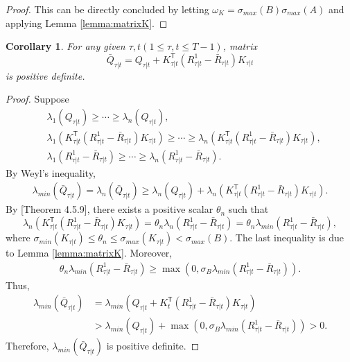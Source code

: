 \documentclass[letterpaper, 10 pt, conference]{ieeeconf}  %
\newcommand{\transpose}{\mathsf{T}}
\newtheorem{corollary}{Corollary}
\begin{document}
\begin{proof}
    This can be directly concluded by letting $\omega_{K} = \sigma_{max}(B)\sigma_{max}(A)$ and applying Lemma \ref{lemma:matrixK}.
\end{proof}

\begin{corollary}
    For any given $\tau,t(1\leq \tau, t \leq T-1)$, matrix
    \begin{equation}
        \bar{Q}_{\tau|t} = Q_{\tau|t} + K_{\tau|t}^{\transpose}(R_{\tau|t}^{1} - \bar{R}_{\tau|t})K_{\tau|t}
    \end{equation}
    is positive definite.
\end{corollary}
\begin{proof}
    Suppose
    \begin{align*}
        &\lambda_{1}(Q_{\tau|t}) \geq \cdots \geq \lambda_{n}(Q_{\tau|t}),\\
        &\lambda_{1}(K_{\tau|t}^{\transpose}(R_{\tau|t}^{1} - \bar{R}_{\tau|t})K_{\tau|t}) \geq \cdots \geq \lambda_{n}(K_{\tau|t}^{\transpose}(R_{\tau|t}^{1} - \bar{R}_{\tau|t})K_{\tau|t}),\\
        &\lambda_{1}(R_{\tau|t}^{1} - \bar{R}_{\tau|t}) \geq \cdots \geq \lambda_{n}(R_{\tau|t}^{1} - \bar{R}_{\tau|t}).
    \end{align*}
    By Weyl's inequality,
    \begin{align*}
        \lambda_{min}(\bar{Q}_{\tau|t}) = \lambda_{n}(\bar{Q}_{\tau|t})\geq \lambda_{n}(Q_{\tau|t}) + \lambda_{n}(K_{\tau|t}^{\transpose}(R_{\tau|t}^{1} - \bar{R}_{\tau|t})K_{\tau|t}).
    \end{align*}
    By \cite{horn_matrix_2013}[Theorem 4.5.9], there exists a positive scalar $\theta_{n}$ such that
    \begin{equation}
        \lambda_{n}(K_{\tau|t}^{\transpose}(R_{\tau|t}^{1} - \bar{R}_{\tau|t})K_{\tau|t}) = \theta_{n}\lambda_{n}(R_{\tau|t}^{1} - \bar{R}_{\tau|t}) = \theta_{n}\lambda_{min}(R_{\tau|t}^{1} - \bar{R}_{\tau|t}),
    \end{equation}
    where $\sigma_{min}(K_{\tau|t}) \leq \theta_{n} \leq \sigma_{max}(K_{\tau|t}) < \sigma_{max}(B)$.
    The last inequality is due to Lemma \ref{lemma:matrixK}. Moreover,
    \begin{align*}
        \theta_{n}\lambda_{min}(R_{\tau|t}^{1} - \bar{R}_{\tau|t}) \geq \max(0,\sigma_{B}\lambda_{min}(R_{\tau|t}^{1} - \bar{R}_{\tau|t})).
    \end{align*}
    Thus, 
    \begin{align*}
        \lambda_{min}(\bar{Q}_{\tau|t}) &= \lambda_{min}(Q_{\tau|t}+K_{t}^{\transpose}(R_{\tau|t}^{1}-\bar{R}_{\tau|t})K_{\tau|t}) \\
        &> \lambda_{min}(Q_{\tau|t}) +\max(0,\sigma_{B}\lambda_{min}(R_{\tau|t}^{1} - \bar{R}_{\tau|t})) > 0.
    \end{align*}
    Therefore, $\lambda_{min}(\bar{Q}_{\tau|t})$ is positive definite.
\end{proof}
\end{document}
